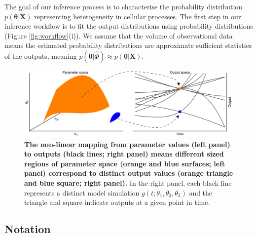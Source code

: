 The goal of our inference process is to  characterise the probability distribution $p(\boldsymbol{\theta}|\boldsymbol{X})$ representing heterogeneity in cellular processes. The first step in our inference workflow is to fit the output distributions using probability distributions (Figure \ref{fig:workflow}(i)). We assume that the volume of observational data means the estimated probability distributions are approximate sufficient statistics of the outputs, meaning $p(\boldsymbol{\theta}|\hat{\Phi}) \approx p(\boldsymbol{\theta}|\boldsymbol{X})$.

\begin{figure}[H]
	\centerline{\includegraphics[width=\textwidth]{../figures/contour_volumes.pdf}}
	\caption{\textbf{The non-linear mapping from parameter values (left panel) to outputs (black lines; right panel) means different sized regions of parameter space (orange and blue surfaces; left panel) correspond to distinct output values (orange triangle and blue square; right panel).} In the right panel, each black line represents a distinct model simulation $g(t; \theta_1, \theta_2, \theta_3)$ and the triangle and square indicate outputs at a given point in time.}
	\label{fig:contour_volumes}
\end{figure}

\subsection{Notation}

